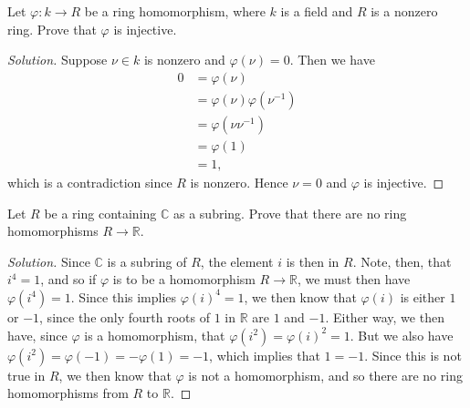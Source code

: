 \documentclass[12pt]{article}
\newenvironment{problem}[2][Problem]{\begin{trivlist}
\item[\hskip \labelsep {\bfseries #1}\hskip \labelsep {\bfseries #2.}]}{\end{trivlist}}
\newenvironment{solution}
  {\renewcommand\qedsymbol{$\blacksquare$}\begin{proof}[Solution]}
{\end{proof}}
\theoremstyle{remark}
\begin{document}
\newpage

\begin{problem}{3.10}
  Let $\varphi:k\to R$ be a ring homomorphism, where $k$ is a field
  and $R$ is a nonzero ring.
  Prove that $\varphi$ is injective.
\end{problem}
\begin{solution}
  Suppose $\nu\in k$ is nonzero and $\varphi(\nu) = 0$.
  Then we have
  \begin{align*}
    0 &= \varphi(\nu) \\
    &= \varphi(\nu)\varphi(\nu^{-1}) \\
    &= \varphi(\nu\nu^{-1}) \\
    &= \varphi(1) \\
    &= 1,
  \end{align*}
  which is a contradiction since $R$ is nonzero.
  Hence $\nu=0$ and $\varphi$ is injective.
\end{solution}

\begin{problem}{3.11}
  Let $R$ be a ring containing $\mathbb{C}$ as a subring.
  Prove that there are no ring homomorphisms $R\to\mathbb{R}$.
\end{problem}
\begin{solution}
  Since $\mathbb{C}$ is a subring of $R$, the element $i$ is then in $R$.
  Note, then, that $i^4=1$, and so if $\varphi$ is to be a 
  homomorphism $R\to\mathbb{R}$, we must then have $\varphi(i^4)=1$.
  Since this implies $\varphi(i)^4=1$, we then know that 
  $\varphi(i)$ is either $1$ or $-1$, since the only fourth roots
  of $1$ in $\mathbb{R}$ are $1$ and $-1$.
  Either way, we then have, since $\varphi$ is a homomorphism,
  that $\varphi(i^2) = \varphi(i)^2=1$.
  But we also have $\varphi(i^2)=\varphi(-1)=-\varphi(1)=-1$, which
  implies that $1=-1$.
  Since this is not true in $R$, we then know that $\varphi$ is not
  a homomorphism, and so there are no ring homomorphisms from $R$ 
  to $\mathbb{R}$.
\end{solution}
\end{document}
